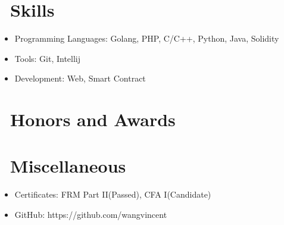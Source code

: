 \documentclass{resume}
\begin{document}

\section{\faCogs\ Skills}
\begin{itemize}[parsep=0.5ex]
  \item Programming Languages: Golang, PHP, C/C++, Python, Java, Solidity
  \item Tools: Git, Intellij
  \item Development: Web, Smart Contract
\end{itemize}

\section{\faHeartO\ Honors and Awards}

\section{\faInfo\ Miscellaneous}
\begin{itemize}[parsep=0.5ex]
  \item Certificates: FRM Part II(Passed), CFA I(Candidate)
  \item GitHub: https://github.com/wangvincent
\end{itemize}

%
%
\end{document}
